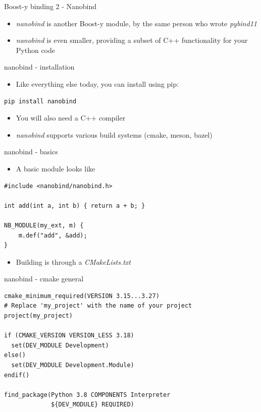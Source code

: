\documentclass[presentation]{beamer}
\begin{document}
\begin{frame}[label=boost-y-binding-2---nanobind]{Boost-y binding 2 - Nanobind}
\begin{itemize}
\item \alert{\emph{nanobind}} is another Boost-y module, by the same person who wrote
\alert{\emph{pybind11}}
\item \alert{\emph{nanobind}} is even smaller, providing a subset of C++ functionality
for your Python code
\end{itemize}
\end{frame}
\begin{frame}[label=nanobind---installation,fragile]{nanobind - installation}
 \begin{itemize}
\item Like everything else today, you can install using pip:
\end{itemize}

\begin{verbatim}
pip install nanobind
\end{verbatim}

\begin{itemize}
\item You will also need a C++ compiler
\item \alert{\emph{nanobind}} supports various build systems (cmake, meson, bazel)
\end{itemize}
\end{frame}
\begin{frame}[label=nanobind---basics,fragile]{nanobind - basics}
 \begin{itemize}
\item A basic module looks like
\end{itemize}

\begin{verbatim}
#include <nanobind/nanobind.h>

int add(int a, int b) { return a + b; }

NB_MODULE(my_ext, m) {
    m.def("add", &add);
}
\end{verbatim}

\begin{itemize}
\item Building is through a \alert{\emph{CMakeLists.txt}}
\end{itemize}
\end{frame}
\begin{frame}[label=nanobind---cmake-general,fragile]{nanobind - cmake general}
 \begin{verbatim}
cmake_minimum_required(VERSION 3.15...3.27)
# Replace 'my_project' with the name of your project
project(my_project)

if (CMAKE_VERSION VERSION_LESS 3.18)
  set(DEV_MODULE Development)
else()
  set(DEV_MODULE Development.Module)
endif()

find_package(Python 3.8 COMPONENTS Interpreter
             ${DEV_MODULE} REQUIRED)
\end{verbatim}
\end{frame}
\end{document}
